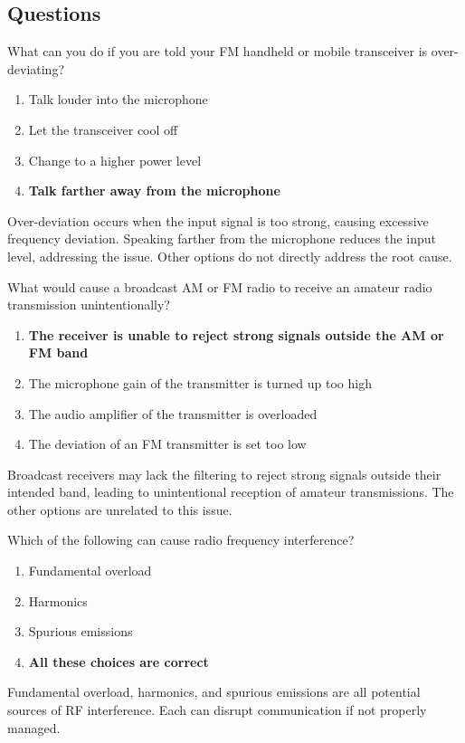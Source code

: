 \subsection*{Questions}
\begin{tcolorbox}[colback=gray!10!white,colframe=black!75!black,title={T7B01}]
    What can you do if you are told your FM handheld or mobile transceiver is over-deviating?
    \begin{enumerate}[label=\Alph*,noitemsep]
        \item Talk louder into the microphone
        \item Let the transceiver cool off
        \item Change to a higher power level
        \item \textbf{Talk farther away from the microphone}
    \end{enumerate}
\end{tcolorbox}
Over-deviation occurs when the input signal is too strong, causing excessive frequency deviation. Speaking farther from the microphone reduces the input level, addressing the issue. Other options do not directly address the root cause.


\begin{tcolorbox}[colback=gray!10!white,colframe=black!75!black,title={T7B02}]
    What would cause a broadcast AM or FM radio to receive an amateur radio transmission unintentionally?
    \begin{enumerate}[label=\Alph*,noitemsep]
        \item \textbf{The receiver is unable to reject strong signals outside the AM or FM band}
        \item The microphone gain of the transmitter is turned up too high
        \item The audio amplifier of the transmitter is overloaded
        \item The deviation of an FM transmitter is set too low
    \end{enumerate}
\end{tcolorbox}
Broadcast receivers may lack the filtering to reject strong signals outside their intended band, leading to unintentional reception of amateur transmissions. The other options are unrelated to this issue.


\begin{tcolorbox}[colback=gray!10!white,colframe=black!75!black,title={T7B03}]
    Which of the following can cause radio frequency interference?
    \begin{enumerate}[label=\Alph*,noitemsep]
        \item Fundamental overload
        \item Harmonics
        \item Spurious emissions
        \item \textbf{All these choices are correct}
    \end{enumerate}
\end{tcolorbox}
Fundamental overload, harmonics, and spurious emissions are all potential sources of RF interference. Each can disrupt communication if not properly managed.

